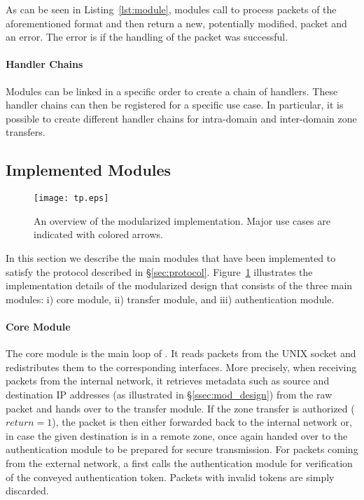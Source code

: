 As can be seen in Listing~\ref{lst:module}, modules call  to process packets
of the aforementioned format and then return a new, potentially modified, packet and an
error. The error is  if the handling of the packet was successful.

\paragraph{Handler Chains}
\label{ssec:chains}

Modules can be linked in a specific order to create a chain of handlers.
These handler chains can then be registered for a specific use case. In particular, it is possible
to create different handler chains for intra-domain and inter-domain zone transfers.

\subsection{Implemented Modules}
\label{ssec:modules}

\begin{figure}[htb]
	\begin{center}
		\texttt{[image: tp.eps]}
	\end{center}
	\caption{An overview of the modularized \tp implementation. Major use cases are
	indicated with colored arrows.}
	\label{fig:tp}
\end{figure}

In this section we describe the main modules that have been implemented to satisfy
the protocol described in \S\ref{sec:protocol}. Figure~\ref{fig:tp} illustrates
the implementation details of the modularized \tp design that consists of the three
main modules: i) core module, ii) transfer module, and iii) authentication module.

\paragraph{Core Module}
The core module is the main loop of \tp. It reads packets from the UNIX socket and
redistributes them to the corresponding interfaces. More precisely, when receiving packets
from the internal network, it retrieves metadata such as source and destination
IP addresses (as illustrated in
\S\ref{ssec:mod_design}) from the raw packet and hands over to the transfer module.
If the zone transfer is authorized ($return=1$),
the packet is then either forwarded back to the internal network or, in case the given destination
is in a remote zone,
once again handed over to the authentication module to be prepared for secure transmission.
For packets coming from the external network, a \tp first calls the authentication module for
verification of the conveyed authentication token. Packets with invalid tokens are simply discarded.

